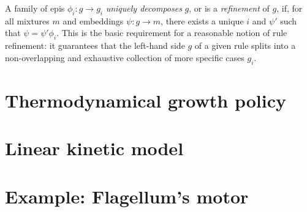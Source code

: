 A family of epis $\phi_i: g \to g_i$ \emph{uniquely decomposes} $g$,
or is a \emph{refinement} of $g$, if,
for all mixtures $m$ and embeddings $\psi: g \to m$,
there exists a unique $i$ and $\psi'$ such that $\psi = \psi' \phi_i$.
This is the basic requirement
for a reasonable notion of rule refinement:
it guarantees that the left-hand side $g$ of a given rule
splits into a non-overlapping and exhaustive collection
of more specific cases $g_i$.


\begin{theorem}
  \label{thm:unique-decomposition}
\end{theorem}







\section{Thermodynamical growth policy} %
\label{sec:energy-gp}


\section{Linear kinetic model}
\label{sec:kinetic-model}

%
%


\section{Example: Flagellum's motor}
\label{sec:alloring}




